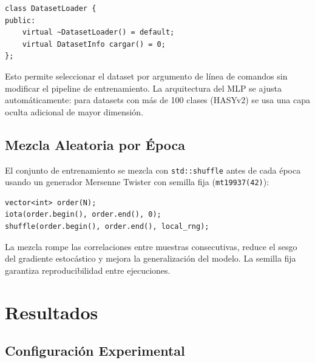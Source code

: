 \documentclass[12pt,a4paper]{article}
\begin{document}
\begin{lstlisting}[caption={Interfaz abstracta DatasetLoader}]
class DatasetLoader {
public:
    virtual ~DatasetLoader() = default;
    virtual DatasetInfo cargar() = 0;
};
\end{lstlisting}

Esto permite seleccionar el dataset por argumento de línea de comandos sin
modificar el pipeline de entrenamiento. La arquitectura del MLP se ajusta
automáticamente: para datasets con más de 100 clases (HASYv2) se usa una capa
oculta adicional de mayor dimensión.

\subsection{Mezcla Aleatoria por Época}

El conjunto de entrenamiento se mezcla con \texttt{std::shuffle} antes de cada época
usando un generador Mersenne Twister con semilla fija (\texttt{mt19937(42)}):

\begin{lstlisting}[caption={Shuffle del orden de muestras por época}]
vector<int> order(N);
iota(order.begin(), order.end(), 0);
shuffle(order.begin(), order.end(), local_rng);
\end{lstlisting}

La mezcla rompe las correlaciones entre muestras consecutivas, reduce el sesgo del
gradiente estocástico y mejora la generalización del modelo. La semilla fija garantiza
reproducibilidad entre ejecuciones.

\section{Resultados}

\subsection{Configuración Experimental}
\end{document}
